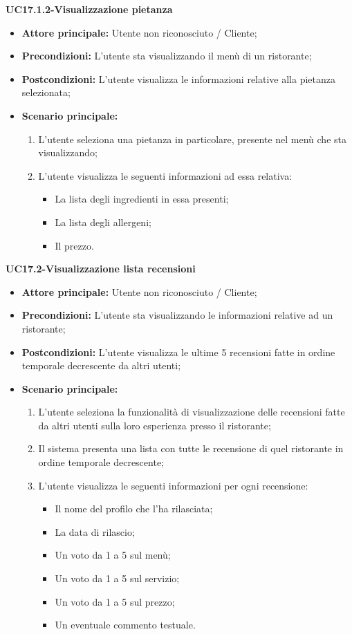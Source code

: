 \textbf{UC17.1.2-Visualizzazione pietanza}
\begin{itemize}
\item \textbf{Attore principale:} Utente non riconosciuto / Cliente;
\item \textbf{Precondizioni:} L'utente sta visualizzando il menù di un ristorante;
\item \textbf{Postcondizioni:} L'utente visualizza le informazioni relative alla pietanza selezionata;
\item \textbf{Scenario principale:}
\begin{enumerate}
    \item L'utente seleziona una pietanza in particolare, presente nel menù che sta visualizzando;
    \item L'utente visualizza le seguenti informazioni ad essa relativa:
    \begin{itemize}
        \item La lista degli ingredienti in essa presenti;
        \item La lista degli allergeni;
        \item Il prezzo.
    \end{itemize}
\end{enumerate}
\end{itemize}

\pagebreak
\textbf{UC17.2-Visualizzazione lista recensioni}
\begin{itemize}
\item \textbf{Attore principale:} Utente non riconosciuto / Cliente;
\item \textbf{Precondizioni:} L'utente sta visualizzando le informazioni relative ad un ristorante;
\item \textbf{Postcondizioni:} L'utente visualizza le ultime 5 recensioni fatte in ordine temporale decrescente da altri utenti;
\item \textbf{Scenario principale:}
\begin{enumerate}
    \item L'utente seleziona la funzionalità di visualizzazione delle recensioni fatte da altri utenti sulla loro esperienza presso il ristorante;
    \item Il sistema presenta una lista con tutte le recensione di quel ristorante in ordine temporale decrescente;
    \item L'utente visualizza le seguenti informazioni per ogni recensione:
    \begin{itemize}
        \item Il nome del profilo che l'ha rilasciata;
        \item La data di rilascio;
        \item Un voto da 1 a 5 sul menù;
        \item Un voto da 1 a 5 sul servizio;
        \item Un voto da 1 a 5 sul prezzo;
        \item Un eventuale commento testuale.
    \end{itemize}
\end{enumerate}
\end{itemize}

